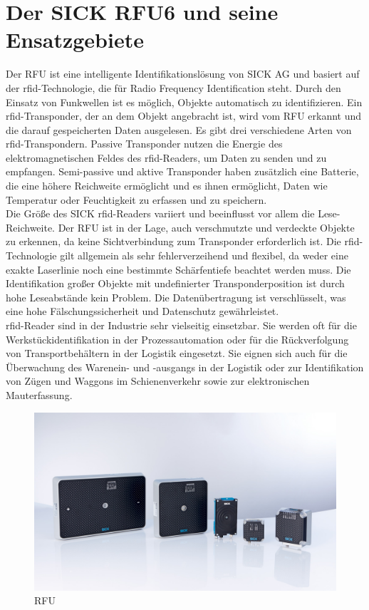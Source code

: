\section{Der SICK RFU6 und seine Ensatzgebiete}

Der RFU ist eine intelligente Identifikationslösung von SICK AG und basiert auf der \ac{rfid}-Technologie, die für Radio Frequency Identification steht. Durch den Einsatz von Funkwellen ist es möglich, Objekte automatisch zu identifizieren. Ein \ac{rfid}-Transponder, der an dem Objekt angebracht ist, wird vom RFU erkannt und die darauf gespeicherten Daten ausgelesen. Es gibt drei verschiedene Arten von \ac{rfid}-Transpondern. Passive Transponder nutzen die Energie des elektromagnetischen Feldes des \ac{rfid}-Readers, um Daten zu senden und zu empfangen. Semi-passive und aktive Transponder haben zusätzlich eine Batterie, die eine höhere Reichweite ermöglicht und es ihnen ermöglicht, Daten wie Temperatur oder Feuchtigkeit zu erfassen und zu speichern.\cite{.07.03.2023}\\

Die Größe des SICK \ac{rfid}-Readers variiert und beeinflusst vor allem die Lese-Reichweite. Der RFU ist in der Lage, auch verschmutzte und verdeckte Objekte zu erkennen, da keine Sichtverbindung zum Transponder erforderlich ist. Die \ac{rfid}-Technologie gilt allgemein als sehr fehlerverzeihend und flexibel, da weder eine exakte Laserlinie noch eine bestimmte Schärfentiefe beachtet werden muss. Die Identifikation großer Objekte mit undefinierter Transponderposition ist durch hohe Leseabstände kein Problem. Die Datenübertragung ist verschlüsselt, was eine hohe Fälschungssicherheit und Datenschutz gewährleistet.\cite{.07.03.2023}\\

\ac{rfid}-Reader sind in der Industrie sehr vielseitig einsetzbar. Sie werden oft für die Werkstückidentifikation in der Prozessautomation oder für die Rückverfolgung von Transportbehältern in der Logistik eingesetzt. Sie eignen sich auch für die Überwachung des Warenein- und -ausgangs in der Logistik oder zur Identifikation von Zügen und Waggons im Schienenverkehr sowie zur elektronischen Mauterfassung.\cite{.07.03.2023}\\
\cite{.07.03.2023}

\begin{figure}[H]
    \centering
    \includegraphics[width=(\textwidth/2)]{Bild/RFU.jpg}
    \caption{RFU\cite{.17.08.2021}}
    \label{fig:RFU}
\end{figure}


